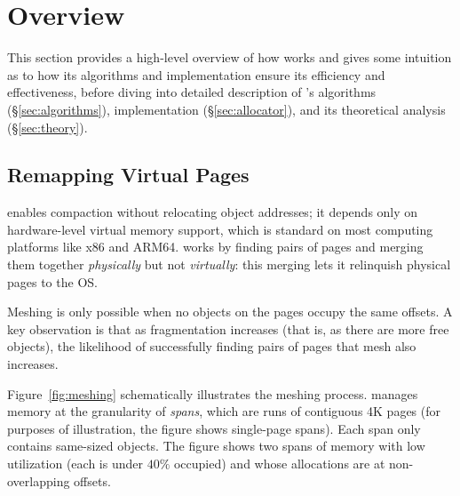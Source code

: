 \section{Overview}
\label{sec:meshing}

This section provides a high-level overview of how \Mesh{} works and
gives some intuition as to how its algorithms and implementation
ensure its efficiency and effectiveness, before diving into detailed
description of \Mesh{}'s algorithms (\S\ref{sec:algorithms}),
implementation (\S\ref{sec:allocator}), and its theoretical analysis
(\S\ref{sec:theory}).


\subsection{Remapping Virtual Pages}

\Mesh{} enables compaction without relocating object addresses; it
depends only on hardware-level virtual memory support, which is
standard on most computing platforms like x86 and ARM64. \Mesh{} works
by finding pairs of pages and merging them together \emph{physically}
but not \emph{virtually}: this merging lets it relinquish
physical pages to the OS.

Meshing is only possible when no objects on the pages occupy the same
offsets.  A key observation is that as fragmentation increases (that
is, as there are more free objects), the likelihood of successfully
finding pairs of pages that mesh also increases.

Figure~\ref{fig:meshing} schematically illustrates the meshing
process. \Mesh{} manages memory at the granularity of \textit{spans},
which are runs of contiguous 4K pages (for purposes of illustration,
the figure shows single-page spans). Each span only contains
same-sized objects. The figure shows two spans of memory with low
utilization (each is under $40\%$ occupied) and whose allocations are at non-overlapping offsets.


